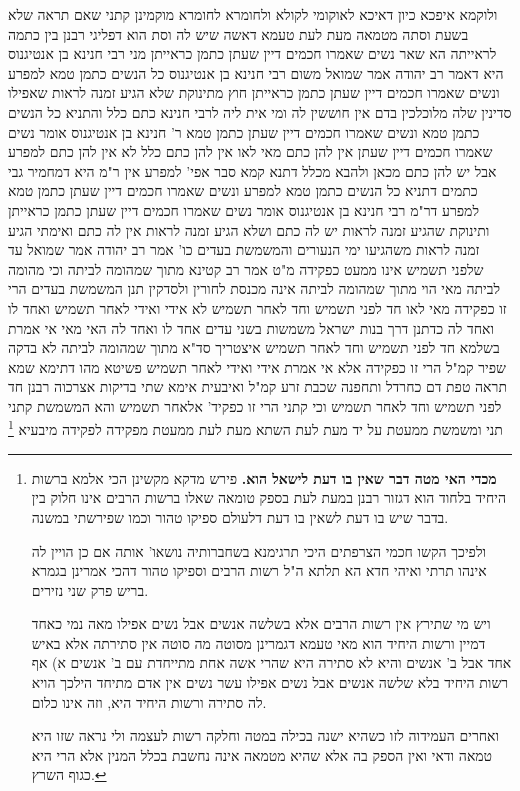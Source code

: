 \documentclass[12pt, openany]{book}
\newcommand{\footnotecomment}[1]{\footnote{#1}}
\newcommand{\commenta}[1]{\footnotecomment{#1}}
\begin{document}
{ולוקמא איפכא 
כיון דאיכא לאוקומי לקולא ולחומרא לחומרא מוקמינן 
קתני  שאם תראה שלא בשעת וסתה מטמאה מעת לעת טעמא דאשה שיש לה וסת הוא דפליגי רבנן בין כתמה לראייתה
הא שאר נשים שאמרו חכמים דיין שעתן כתמן כראייתן 
מני  רבי חנינא בן אנטיגנוס היא  דאמר רב יהודה אמר שמואל משום רבי חנינא בן אנטיגנוס  כל הנשים כתמן טמא למפרע  ונשים שאמרו חכמים דיין שעתן כתמן כראייתן חוץ מתינוקת שלא הגיע זמנה לראות שאפילו סדינין שלה מלוכלכין בדם אין חוששין לה 
ומי אית ליה לרבי חנינא כתם כלל  והתניא  כל הנשים כתמן טמא ונשים שאמרו חכמים דיין שעתן כתמן טמא  ר' חנינא בן אנטיגנוס אומר  נשים שאמרו חכמים דיין שעתן אין להן כתם  מאי לאו  אין להן כתם כלל  לא אין להן כתם למפרע אבל יש להן כתם מכאן ולהבא 
מכלל דתנא קמא סבר  אפי' למפרע  אין ר"מ היא דמחמיר גבי כתמים  דתניא  כל הנשים כתמן טמא למפרע ונשים שאמרו חכמים דיין שעתן כתמן טמא למפרע דר"מ 
רבי חנינא בן אנטיגנוס אומר  נשים שאמרו חכמים דיין שעתן כתמן כראייתן  ותינוקת שהגיע זמנה לראות יש לה כתם ושלא הגיע זמנה לראות אין לה כתם  ואימתי הגיע זמנה לראות  משהגיעו ימי הנעורים
והמשמשת בעדים כו' אמר רב יהודה אמר שמואל  עד שלפני תשמיש אינו ממעט כפקידה 
מ"ט  אמר רב קטינא  מתוך שמהומה לביתה  וכי מהומה לביתה מאי הוי  מתוך שמהומה לביתה אינה מכנסת לחורין ולסדקין 
תנן  המשמשת בעדים הרי זו כפקידה מאי לאו  חד לפני תשמיש וחד לאחר תשמיש  לא אידי ואידי לאחר תשמיש ואחד לו ואחד לה  כדתנן  דרך בנות ישראל משמשות בשני עדים אחד לו ואחד לה 
האי מאי  אי אמרת בשלמא חד לפני תשמיש וחד לאחר תשמיש איצטריך סד"א  מתוך שמהומה לביתה לא בדקה שפיר קמ"ל  הרי זו כפקידה אלא אי אמרת  אידי ואידי לאחר תשמיש פשיטא 
מהו דתימא  שמא תראה טפת דם כחרדל ותחפנה שכבת זרע קמ"ל 
ואיבעית אימא  שתי בדיקות אצרכוה רבנן חד לפני תשמיש וחד לאחר תשמיש וכי קתני הרי זו כפקיד' אלאחר תשמיש  והא המשמשת קתני  תני  ומשמשת
ממעטת על יד מעת לעת השתא מעת לעת ממעטת
מפקידה לפקידה מיבעיא 
\commenta{\textbf{מכדי האי מטה דבר שאין בו דעת לישאל הוא.}  פירש מדקא מקשינן הכי אלמא ברשות היחיד בלחוד הוא דגזור רבנן במעת לעת בספק טומאה שאלו ברשות הרבים אינו חלוק בין בדבר שיש בו דעת לשאין בו דעת דלעולם ספיקו טהור וכמו שפירשתי במשנה.\par  ולפיכך הקשו חכמי הצרפתים היכי תרגימנא בשחברותיה נושאו' אותה אם כן הויין לה אינהו תרתי ואיהי חדא הא תלתא ה"ל רשות הרבים וספיקו טהור דהכי אמרינן בגמרא בריש פרק שני נזירים.\par  ויש מי שתירץ אין רשות הרבים אלא בשלשה אנשים אבל נשים אפילו מאה נמי כאחד דמיין ורשות היחיד הוא מאי טעמא דגמרינן מסוטה מה סוטה אין סתירתה אלא באיש אחד אבל ב' אנשים והיא לא סתירה היא שהרי אשה אחת מתייחדת עם ב' אנשים א) אף רשות היחיד בלא שלשה אנשים אבל נשים אפילו עשר נשים אין אדם מתיחד הילכך הויא לה סתירה ורשות היחיד היא, וזה אינו כלום.\par  ואחרים העמידוה לזו כשהיא ישנה בכילה במטה וחלקה רשות לעצמה ולי נראה שזו היא טמאה ודאי ואין הספק בה אלא שהיא מטמאה אינה נחשבת בכלל המנין אלא הרי היא כגוף השרץ. }

}
\end{document}
